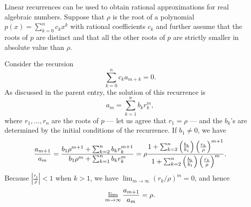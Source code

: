 \documentclass[12pt]{article}
\begin{document}
Linear recurrences can be used to obtain rational approximations for real
algebraic numbers.  Suppose that $\rho$ is the root of a polynomial
$p(x) = \sum_{k=0}^n c_k x^k$ with rational coefficients $c_k$ and 
further assume that the roots of $p$ are distinct and that all the
other roots of $p$ are strictly smaller in absolute value than $\rho$.

Consider the recursion
\[
 \sum_{k=0}^n c_k a_{m+k} = 0.
\]
As discussed in the parent entry, the solution of this recurrence
is
\[
 a_m = \sum_{k=1}^n b_k r_k^m,
\]
where $r_1, \ldots, r_n$ are the roots of $p$ --- let us agree that
$r_1 = \rho$ --- and the $b_k$'s are determined by the initial conditions
of the recurrence.  If $b_1 \neq 0$, we have
\[
 {a_{m+1} \over a_m} = 
 {b_1 \rho^{m+1} + \sum_{k=2}^n b_k r_k^{m+1} \over 
  b_1 \rho^m + \sum_{k=1}^n b_k r_k^m} =
 \rho {1 + \sum_{k=2}^n \left( {b_k \over b_1} \right) 
                  \left( {r_k \over \rho} \right)^{m+1} \over 
       1 + \sum_{k=2}^n \left( {b_k \over b_1} \right) 
                        \left( {r_k \over \rho} \right)^m}.
\]
Because $|\frac{r_k}{\rho}| < 1$ when $k > 1$, we have $\lim_{m \to \infty}
(r_k / \rho)^m = 0$, and hence
\[
 \lim_{m \to \infty} {a_{m+1} \over a_m} = \rho.
\]
\end{document}
